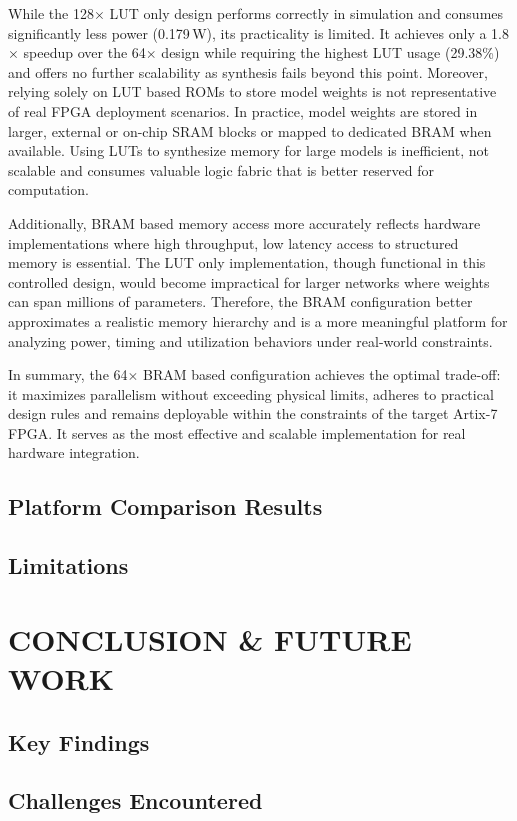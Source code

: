 \documentclass[a4paper,12pt]{report}
\begin{document}
While the 128$\times$ LUT only design performs correctly in simulation and consumes significantly less power (0.179\,W), its practicality is limited. It achieves only a 1.8$\times$ speedup over the 64$\times$ design while requiring the highest LUT usage (29.38\%) and offers no further scalability as synthesis fails beyond this point. Moreover, relying solely on LUT based ROMs to store model weights is not representative of real FPGA deployment scenarios. In practice, model weights are stored in larger, external or on-chip SRAM blocks or mapped to dedicated BRAM when available. Using LUTs to synthesize memory for large models is inefficient, not scalable and consumes valuable logic fabric that is better reserved for computation.

Additionally, BRAM based memory access more accurately reflects hardware implementations where high throughput, low latency access to structured memory is essential. The LUT only implementation, though functional in this controlled design, would become impractical for larger networks where weights can span millions of parameters. Therefore, the BRAM configuration better approximates a realistic memory hierarchy and is a more meaningful platform for analyzing power, timing and utilization behaviors under real-world constraints.

In summary, the 64$\times$ BRAM based configuration achieves the optimal trade-off: it maximizes parallelism without exceeding physical limits, adheres to practical design rules and remains deployable within the constraints of the target Artix-7 FPGA. It serves as the most effective and scalable implementation for real hardware integration.


\section{Platform Comparison Results}

\section{Limitations}



\clearpage
\chapter{CONCLUSION \& FUTURE WORK}
\label{chapter:conclusion_and_future work}

\section{Key Findings}

\section{Challenges Encountered}

\printbibliography
\end{document}
